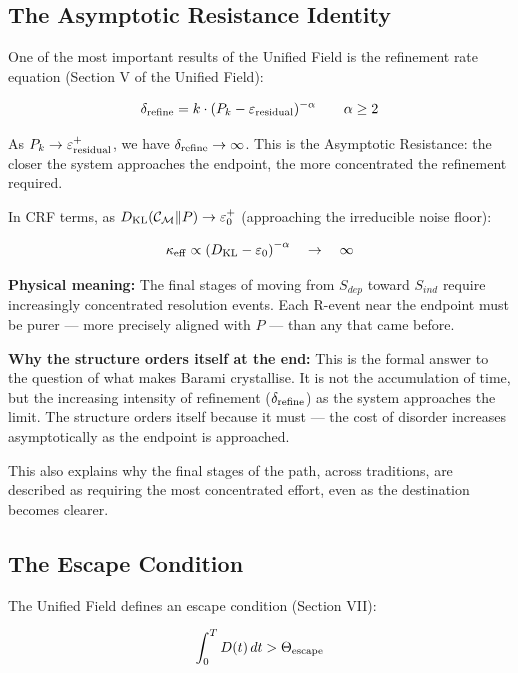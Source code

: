\documentclass[12pt, a4paper]{article}
\begin{document}
\subsection{The Asymptotic Resistance Identity}

One of the most important results of the Unified Field is the refinement rate equation
(Section V of the Unified Field):

\[
  \delta_{\rm refine} = k \cdot (P_k - \varepsilon_{\rm residual})^{-\alpha}
  \qquad \alpha \geq 2
\]

As $P_k \to \varepsilon_{\rm residual}^+$, we have $\delta_{\rm refine} \to \infty$.
This is the Asymptotic Resistance: the closer the system approaches the endpoint,
the more concentrated the refinement required.

\begin{derivedbox}[title={CRF Equivalent: Asymptotic Resistance Near $S_{ind}$}]
In CRF terms, as $D_{\rm KL}(\mathcal{C}_\mathcal{M}\|P) \to \varepsilon_0^+$
(approaching the irreducible noise floor):

\[
  \kappa_{\rm eff} \propto \left(D_{\rm KL} - \varepsilon_0\right)^{-\alpha}
  \quad \to \quad \infty
\]

\textbf{Physical meaning:} The final stages of moving from $S_{dep}$ toward $S_{ind}$
require increasingly concentrated resolution events. Each R-event near the endpoint
must be purer --- more precisely aligned with $P$ --- than any that came before.

\textbf{Why the structure orders itself at the end:}
This is the formal answer to the question of what makes Barami crystallise. It is
not the accumulation of time, but the increasing intensity of refinement ($\delta_{\rm refine}$)
as the system approaches the limit. The structure orders itself because it must ---
the cost of disorder increases asymptotically as the endpoint is approached.

This also explains why the final stages of the path, across traditions, are
described as requiring the most concentrated effort, even as the destination
becomes clearer.
\end{derivedbox}

\subsection{The Escape Condition}

The Unified Field defines an escape condition (Section VII):

\[
  \int_0^T D(t)\,dt > \Theta_{\rm escape}
\]
\end{document}
